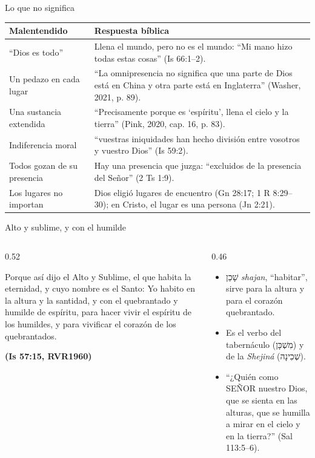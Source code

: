 \documentclass[hyperref={bookmarks=false},aspectratio=169]{beamer}
\newcommand{\heb}[1]{\mbox{\foreignlanguage{hebrew}{#1}}}
\newcommand{\SENOR}{S{\fontsize{0.78em}{1em}\selectfont EÑOR}}
\newcommand{\fuente}[1]{\par\hfill{\upshape\bfseries\footnotesize\textcolor{azul}{#1}}}
\begin{document}
\begin{frame}{Lo que no significa}
\scriptsize\renewcommand{\arraystretch}{1.15}
\begin{tabular}{@{}>{\RaggedRight\arraybackslash}p{3.0cm}>{\RaggedRight\arraybackslash}p{8.8cm}@{}}
\toprule
\textbf{Malentendido} & \textbf{Respuesta bíblica} \\ \midrule
``Dios es todo'' & Llena el mundo, pero no es el mundo: ``Mi mano hizo todas estas cosas'' (Is 66:1--2). \\
Un pedazo en cada lugar & ``La omnipresencia no significa que una parte de Dios está en China y otra parte está en Inglaterra'' (Washer, 2021, p. 89). \\
Una sustancia extendida & ``Precisamente porque es `espíritu', llena el cielo y la tierra'' (Pink, 2020, cap. 16, p. 83). \\
Indiferencia moral & ``vuestras iniquidades han hecho división entre vosotros y vuestro Dios'' (Is 59:2). \\
Todos gozan de su presencia & Hay una presencia que juzga: ``excluidos de la presencia del Señor'' (2 Ts 1:9). \\
Los lugares no importan & Dios eligió lugares de encuentro (Gn 28:17; 1 R 8:29--30); en Cristo, el lugar es una persona (Jn 2:21). \\
\bottomrule
\end{tabular}
\end{frame}

\begin{frame}{Alto y sublime, y con el humilde}
\begin{columns}[c,onlytextwidth]
\begin{column}{0.52\textwidth}
\begin{cita}[fontupper=\scriptsize\itshape]Porque así dijo el Alto y Sublime, el que habita la eternidad, y cuyo nombre es el Santo: Yo habito en la altura y la santidad, y con el quebrantado y humilde de espíritu, para hacer vivir el espíritu de los humildes, y para vivificar el corazón de los quebrantados.\fuente{(Is 57:15, RVR1960)}\end{cita}
\end{column}
\begin{column}{0.46\textwidth}\small
\begin{itemize}
\item \heb{שָׁכַן} \emph{shajan}, ``habitar'', sirve para la altura y para el corazón quebrantado.
\item Es el verbo del tabernáculo (\heb{מִשְׁכָּן}) y de la \emph{Shejiná} (\heb{שְׁכִינָה}).
\item ``¿Quién como \SENOR{} nuestro Dios, que se sienta en las alturas, que se humilla a mirar en el cielo y en la tierra?'' (Sal 113:5--6).
\end{itemize}
\end{column}
\end{columns}
\end{frame}
\end{document}
